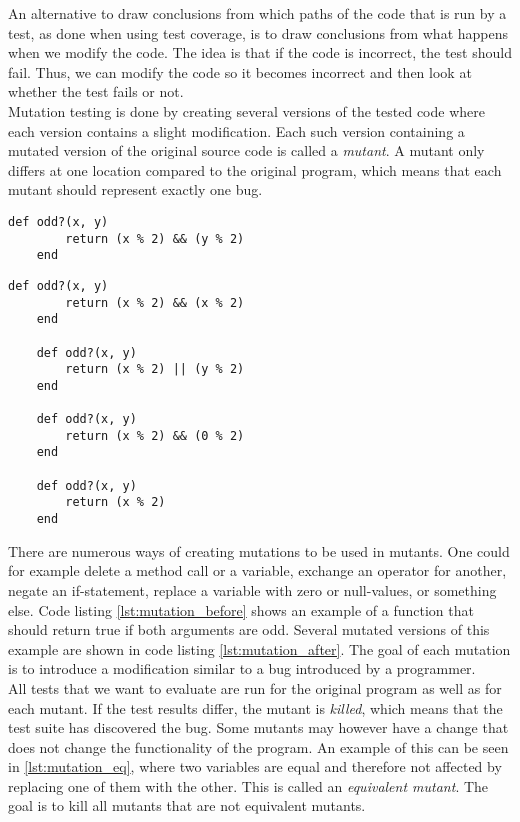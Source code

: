 An alternative to draw conclusions from which paths of the code that is
run by a test, as done when using test coverage, is to draw conclusions
from what happens when we modify the code. The idea is that if the code
is incorrect, the test should fail. Thus, we can modify the code so it
becomes incorrect and then look at whether the test fails or not.\\

Mutation testing is done by creating several versions of the tested
code where each version contains a slight modification. Each
such version containing a mutated version of the original source code is
called a \emph{mutant}. A mutant only differs at one location compared
to the original program, which means that each mutant should represent
exactly one bug. \cite{article:mutation, wiki:mutation}\\

\begin{lstlisting}[caption=Example of a piece of code before mutation,
                   label=lst:mutation_before, float=t]
    def odd?(x, y)
        return (x % 2) && (y % 2)
    end
\end{lstlisting}


\begin{lstlisting}[caption=Mutated versions of \ref{lst:mutation_before},
                   label=lst:mutation_after, float=t]
    def odd?(x, y)
        return (x % 2) && (x % 2)
    end

    def odd?(x, y)
        return (x % 2) || (y % 2)
    end

    def odd?(x, y)
        return (x % 2) && (0 % 2)
    end

    def odd?(x, y)
        return (x % 2)
    end
\end{lstlisting}

There are numerous ways of creating mutations to be used in mutants. One
could for example delete a method call or a variable, exchange an
operator for another, negate an if-statement, replace a variable with
zero or null-values, or something else. Code listing
\ref{lst:mutation_before} shows an example of a function that should
return true if both arguments are odd. Several mutated versions of this
example are shown in code listing \ref{lst:mutation_after}. The goal of
each mutation is to introduce a modification similar to a bug introduced
by a programmer. \cite{article:mutation}\\

All tests that we want to evaluate are run for the original program as
well as for each mutant. If the test results differ, the mutant is
\emph{killed}, which means that the test suite has discovered the bug.
Some mutants may however have a change that does not change the
functionality of the program. An example of this can be seen in
\ref{lst:mutation_eq}, where two variables are equal and therefore not
affected by replacing one of them with the other. This is called an
\emph{equivalent mutant}. The goal is to kill all mutants that are not
equivalent mutants. \cite{article:mutation, wiki:mutation}\\

